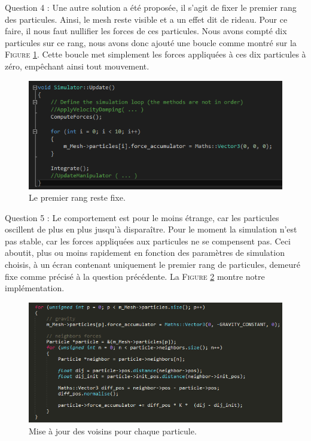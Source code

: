 \documentclass[a4paper,12pt]{article}
\begin{document}
Question 4 : Une autre solution a été proposée, il s'agit de fixer le premier rang des particules. Ainsi, le mesh reste visible et a un effet dit \og{}de rideau\fg{}. Pour ce faire, il nous faut nullifier les forces de ces particules. Nous avons compté dix particules sur ce rang, nous avons donc ajouté une boucle comme montré sur la \textsc{Figure} \ref{fig:q4}. Cette boucle met simplement les forces appliquées à ces dix particules à zéro, empêchant ainsi tout mouvement.
\begin{figure}
  \centering
  \includegraphics{images/q4.png}
  \caption{Le premier rang reste fixe.}
  \label{fig:q4}
\end{figure}

Question 5 : Le comportement est pour le moins étrange, car les particules oscillent de plus en plus jusqu'à disparaître. Pour le moment la simulation n'est pas stable, car les forces appliquées aux particules ne se compensent pas. Ceci aboutit, plus ou moins rapidement en fonction des paramètres de simulation choisis, à un écran contenant uniquement le premier rang de particules, demeuré fixe comme précisé à la question précédente.
La \textsc{Figure} \ref{fig:q5} montre notre implémentation.
\begin{figure}
  \centering
  \includegraphics{images/q5.png}
  \caption{Mise à jour des voisins pour chaque particule.}
  \label{fig:q5}
\end{figure}
\end{document}

